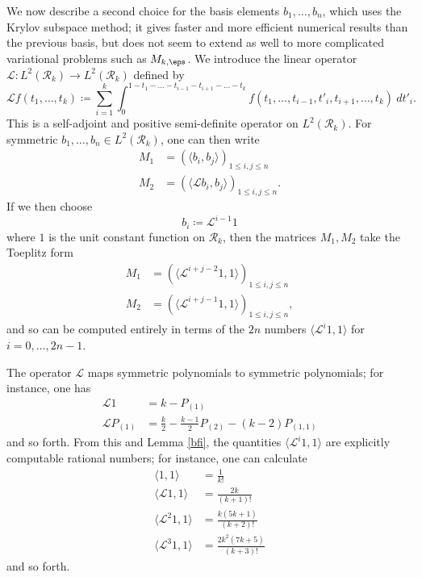We now describe a second choice for the basis elements $b_1,\dots,b_n$, which uses the Krylov subspace method; it gives faster and more efficient numerical results than the previous basis, but does not seem to extend as well to more complicated variational problems such as $M_{k,\eps}$.  We introduce the linear operator ${\mathcal L}: L^2({\mathcal R}_k) \to L^2({\mathcal R}_k)$ defined by
$$ {\mathcal L} f( t_1,\dots,t_k) \coloneqq \sum_{i=1}^k \int_0^{1-t_1-\dots-t_{i-1}-t_{i+1}-\dots-t_k} f(t_1,\dots,t_{i-1},t'_i,t_{i+1},\dots,t_k)\ dt'_i.$$
This is a self-adjoint and positive semi-definite operator on $L^2({\mathcal R}_k)$.  For symmetric $b_1,\dots,b_n \in L^2({\mathcal R}_k)$, one can then write
\begin{align*}
M_1 &= \left( \langle b_i, b_j \rangle \right)_{1 \leq i,j \leq n} \\
M_2 &= \left( \langle {\mathcal L} b_i, b_j \rangle \right)_{1 \leq i,j \leq n}.
\end{align*}
If we then choose
$$ b_i \coloneqq {\mathcal L}^{i-1} 1$$
where $1$ is the unit constant function on ${\mathcal R}_k$, then the matrices $M_1,M_2$ take the Toeplitz form
\begin{align*}
M_1 &= \left( \langle {\mathcal L}^{i+j-2} 1, 1 \rangle \right)_{1 \leq i,j \leq n} \\
M_2 &= \left( \langle {\mathcal L}^{i+j-1} 1, 1 \rangle \right)_{1 \leq i,j \leq n},
\end{align*}
and so can be computed entirely in terms of the $2n$ numbers $\langle {\mathcal L}^i 1, 1 \rangle$ for $i=0,\dots,2n-1$.  

The operator ${\mathcal L}$ maps symmetric polynomials to symmetric polynomials; for instance, one has
\begin{align*}
{\mathcal L} 1 &= k - P_{(1)} \\
{\mathcal L} P_{(1)} &= \frac{k}{2} - \frac{k-1}{2} P_{(2)} - (k-2) P_{(1,1)}
\end{align*}
and so forth.  From this and Lemma \ref{bfi}, the quantities $\langle {\mathcal L}^i 1, 1 \rangle$ are explicitly computable rational numbers; for instance, one can calculate
\begin{align*}
\langle 1, 1 \rangle &= \frac{1}{k!} \\
\langle {\mathcal L} 1, 1\rangle &= \frac{2k}{(k+1)!} \\
\langle {\mathcal L}^2 1, 1\rangle &= \frac{k (5k+1)}{(k+2)!} \\
\langle {\mathcal L}^3 1, 1\rangle &= \frac{2k^2 (7k+5)}{(k+3)!} 
\end{align*}
and so forth.




